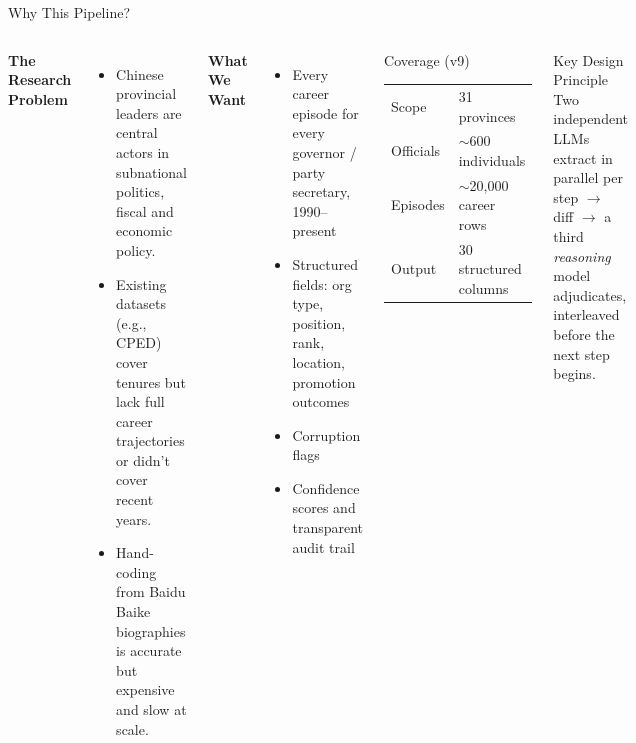 \documentclass[aspectratio=169, 10pt]{beamer}
\begin{document}
\begin{frame}{Why This Pipeline?}
  \begin{columns}[T]
    \textbf{The Research Problem}
    \begin{itemize}
      \item Chinese provincial leaders are central actors in subnational politics, fiscal and economic policy.
      \item Existing datasets (e.g., CPED) cover tenures but \alert{lack full career trajectories} or didn't cover recent years.
      \item Hand-coding from Baidu Baike biographies is accurate but \alert{expensive and slow} at scale.
    \end{itemize}

    \textbf{What We Want}
    \begin{itemize}
      \item Every career episode for every governor / party secretary, 1990–present
      \item Structured fields: org type, position, rank, location, promotion outcomes
      \item Corruption flags
      \item Confidence scores and transparent audit trail
    \end{itemize}

    \begin{block}{Coverage (v9)}
      \begin{tabular}{ll}
        \toprule
        Scope & 31 provinces \\
        Officials & $\sim$600 individuals \\
        Episodes & $\sim$20{,}000 career rows \\
        Output & 30 structured columns \\
        \bottomrule
      \end{tabular}
    \end{block}

    \bigskip
    \begin{block}{Key Design Principle}
      \small
      Two independent LLMs extract in parallel per step $\rightarrow$ diff $\rightarrow$ a third \emph{reasoning} model adjudicates, interleaved before the next step begins.
    \end{block}
  \end{columns}
\end{frame}

\end{document}
